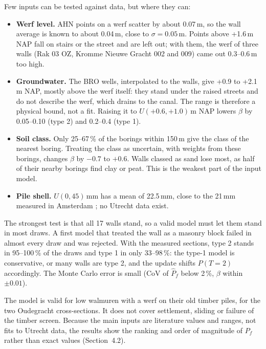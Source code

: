 Few inputs can be tested against data, but where they can:
\begin{itemize}\setlength{\itemsep}{0pt}\setlength{\parskip}{0pt}
  \item \textbf{Werf level.} AHN points on a werf scatter by about 0.07\,m,
    so the wall average is known to about 0.04\,m, close to $\sigma =
    0.05$\,m. Points above +1.6\,m NAP fall on stairs or the street and are
    left out; with them, the werf of three walls (Rak 03 OZ, Kromme Nieuwe
    Gracht 002 and 009) came out 0.3--0.6\,m too high.
  \item \textbf{Groundwater.} The BRO wells, interpolated to the walls, give
    +0.9 to +2.1\,m NAP, mostly above the werf itself: they stand under the
    raised streets and do not describe the werf, which drains to the canal.
    The range is therefore a physical bound, not a fit. Raising it to
    $U(+0.6, +1.0)$\,m NAP lowers $\beta$ by 0.05--0.10 (type 2) and 0.2--0.4
    (type 1).
  \item \textbf{Soil class.} Only 25--67\,\% of the borings within 150\,m
    give the class of the nearest boring. Treating the class as uncertain,
    with weights from these borings, changes $\beta$ by $-0.7$ to $+0.6$. Walls
    classed as sand lose most, as half of their nearby borings find clay or
    peat. This is the weakest part of the input model.
  \item \textbf{Pile shell.} $U(0, 45)$\,mm has a mean of 22.5\,mm, close to
    the 21\,mm measured in Amsterdam \cite{hemel2023}; no Utrecht data exist.
\end{itemize}

The strongest test is that all 17 walls stand, so a valid model must let
them stand in most draws. A first model that treated the wall as a masonry
block failed in almost every draw and was rejected. With the measured
sections, type 2 stands in 95--100\,\% of the draws and type 1 in only
33--98\,\%: the type-1 model is conservative, or many walls are type 2, and
the update shifts $P(T{=}2)$ accordingly. The Monte Carlo error is small
(CoV of $\hat P_f$ below 2\,\%, $\beta$ within $\pm 0.01$).

The model is valid for low walmuren with a werf on their old timber piles,
for the two Oudegracht cross-sections. It does not cover settlement, sliding
or failure of the timber screen. Because the main inputs are literature
values and ranges, not fits to Utrecht data, the results show the ranking and
order of magnitude of $P_f$ rather than exact values (Section~4.2).
